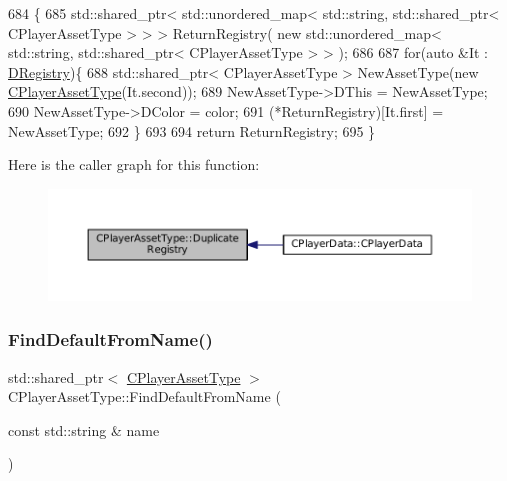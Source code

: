\begin{DoxyCode}
684                                                                                                            
                                  \{
685     std::shared\_ptr< std::unordered\_map< std::string, std::shared\_ptr< CPlayerAssetType > > > 
      ReturnRegistry( \textcolor{keyword}{new} std::unordered\_map< std::string, std::shared\_ptr< CPlayerAssetType > > );
686     
687     \textcolor{keywordflow}{for}(\textcolor{keyword}{auto} &It : \hyperlink{classCPlayerAssetType_a24f4ccd06fbddacc936e31a2f1f12ed5}{DRegistry})\{
688         std::shared\_ptr< CPlayerAssetType > NewAssetType(\textcolor{keyword}{new} \hyperlink{classCPlayerAssetType_a2f8429c4ef261d52ea6ded8d7b4e09ee}{CPlayerAssetType}(It.second));
689         NewAssetType->DThis = NewAssetType;
690         NewAssetType->DColor = color;
691         (*ReturnRegistry)[It.first] = NewAssetType;
692     \}
693 
694     \textcolor{keywordflow}{return} ReturnRegistry;
695 \}
\end{DoxyCode}
Here is the caller graph for this function\+:
\nopagebreak
\begin{figure}[H]
\begin{center}
\leavevmode
\includegraphics[width=350pt]{classCPlayerAssetType_a6dfbccbbed7fecec6b7e2c51ac22fe5a_icgraph}
\end{center}
\end{figure}
\hypertarget{classCPlayerAssetType_a7e1684eac4efaf7afe9a5c15af262b33}{}\label{classCPlayerAssetType_a7e1684eac4efaf7afe9a5c15af262b33} 
\subsubsection{\texorpdfstring{Find\+Default\+From\+Name()}{FindDefaultFromName()}}
{\footnotesize\ttfamily std\+::shared\+\_\+ptr$<$ \hyperlink{classCPlayerAssetType}{C\+Player\+Asset\+Type} $>$ C\+Player\+Asset\+Type\+::\+Find\+Default\+From\+Name (\begin{DoxyParamCaption}\item[{const std\+::string \&}]{name }\end{DoxyParamCaption})\hspace{0.3cm}{\ttfamily [static]}}



